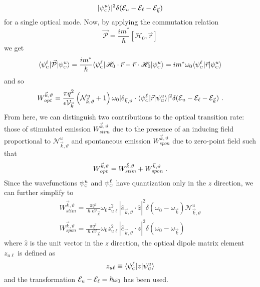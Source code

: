 {\begin{equation}
\vert \psi_\tn{\tiny{C}}^u\rangle\vert^2 \delta(\EE_u-\EE_\ell-\EE_{\vec{k}})
\end{equation}
for a single optical mode.  Now, by applying the commutation relation \cite{CohenTannoudji}
\begin{equation}
\vec{\mathcal{P}} = \frac{i m^*}{\hslash} [\mathscr{H}_0,\vec{r}]
\end{equation}
we get
\begin{equation}
\langle \psi_{\textnormal{\tiny{C}}}^\ell \vert \vec{\mathcal{P}}
\vert \psi_{\textnormal{\tiny{C}}}^u\rangle = \frac{i m^*}{\hslash} \langle \psi_{\textnormal{\tiny{C}}}^\ell \vert \mathscr{H}_0\cdot\vec{r} - \vec{r}\cdot\mathscr{H}_0 \vert \psi_{\textnormal{\tiny{C}}}^u\rangle = i m^* \omega_{0} \langle \psi_{\textnormal{\tiny{C}}}^\ell \vert \vec{r} \vert \psi_{\textnormal{\tiny{C}}}^u\rangle
\end{equation}
and so
\begin{equation}
W_\textit{opt}^{\vec{k},\vartheta} = \frac{\pi q^2}{\epsilon \mathcal{V}_{\vec{k}}} \left(\mathcal{N}_{\vec{k},\vartheta}^u+1\right) \omega_{0}
\vert\hat{e}_{\vec{k},\vartheta} \cdot \langle \psi_\tn{\tiny{C}}^\ell \vert \vec{r} \vert \psi_\tn{\tiny{C}}^u\rangle\vert^2 \delta(\EE_u-\EE_\ell-\EE_{\vec{k}}) \tn{~.}
\end{equation}
From here, we can distinguish two contributions to the optical transition rate: those of stimulated emission $W_\textit{stim}^{\vec{k},\vartheta}$ due to the presence of an inducing field proportional to $\mathcal{N}_{\vec{k},\vartheta}^u$ and spontaneous emission $W_\textit{spon}^{\vec{k},\vartheta}$ due to zero-point field such that
\begin{equation}
W_\textit{opt}^{\vec{k},\vartheta} = W_\textit{stim}^{\vec{k},\vartheta}+W_\textit{spon}^{\vec{k},\vartheta} \textnormal{~.}
\end{equation}
Since the wavefunctions $\psi_{\textnormal{\tiny{C}}}^u$ and $\psi_{\textnormal{\tiny{C}}}^\ell$ have quantization only in the $z$ direction, we can further simplify to
\begin{subequations}
\begin{gather}
W_\textit{stim}^{\vec{k},\vartheta} = \frac{\pi q^2}{\hslash \epsilon \mathcal{V}_{\vec{k}}} \omega_{0}
z_{u\ell}^2
|\hat{e}_{\vec{k},\vartheta} \cdot \hat{z} |^2  %
\delta(\omega_0-\omega_{\vec{k}}) \mathcal{N}_{\vec{k},\vartheta}^u\\
W_\textit{spon}^{\vec{k},\vartheta} = \frac{\pi q^2}{\hslash \epsilon \mathcal{V}_{\vec{k}}} \omega_{0}
z_{u\ell}^2
|\hat{e}_{\vec{k},\vartheta} \cdot \hat{z} |^2  %
\delta(\omega_0-\omega_{\vec{k}})
\label{chpt1eqn:WsponMode1}
\end{gather}
\end{subequations}
where $\hat{z}$ is the unit vector in the $z$ direction, the optical dipole matrix element $z_{u\ell}$ is defined as
\begin{equation}
z_{u\ell}\equiv\langle \psi_{\textnormal{\tiny{C}}}^\ell \vert z \vert \psi_{\textnormal{\tiny{C}}}^u\rangle
\end{equation}
and the transformation $\EE_u-\EE_\ell=\hslash \omega_0$ has been used.

}
